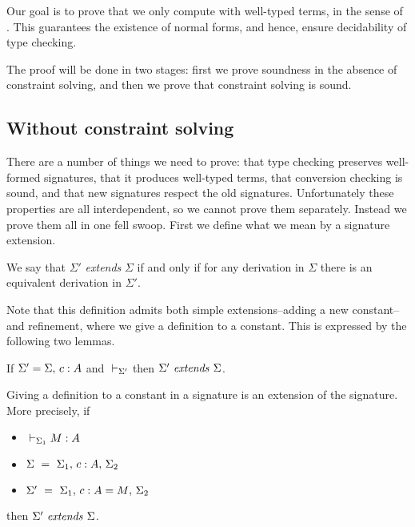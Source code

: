 
Our goal is to prove that we only compute with well-typed terms, in the sense
of {\Core}. This guarantees the existence of normal forms, and hence, ensure
decidability of type checking.

The proof will be done in two stages: first we prove soundness in the absence
of constraint solving, and then we prove that constraint solving
is sound.

\subsection{Without constraint solving}

There are a number of things we need to prove: that type checking preserves
well-formed signatures, that it produces well-typed terms, that conversion
checking is sound, and that new signatures respect the old signatures.
Unfortunately these properties are all interdependent, so we cannot prove them
separately. Instead we prove them all in one fell swoop. First we define what
we mean by a signature extension.

\begin{definition} \label{defSigExt}
    We say that $\Sigma'$ {\em extends} $\Sigma$ if and only if for any {\Core}
    derivation in $\Sigma$ there is an equivalent derivation in $\Sigma'$.
\end{definition}

Note that this definition admits both simple extensions--adding a new
constant--and refinement, where we give a definition to a constant. This is
expressed by the following two lemmas.

\begin{lemma} \label{lemWeakenSig}
    If $\Sigma' = {\Sigma},\,{} {c:A}$ and ${} \vdash_{\Sigma'}$ then ${\Sigma'} ~ \mathit{extends} ~ {\Sigma}$.
\end{lemma}

\begin{lemma} \label{lemRefineSig}
    Giving a definition to a constant in a signature is an extension of the
    signature.
\if {}
    More precisely, if
    \begin{itemize}
	\item ${} \vdash_{\Sigma_1} {M} : {A}$
	\item $\Sigma ~ = ~ {\Sigma_1},\,{} {{c} : {A}},\,{} \Sigma_2$
	\item $\Sigma' ~ = ~ {\Sigma_1},\,{} {{c} : {A} = {M}},\,{} \Sigma_2$
    \end{itemize}
    then ${\Sigma'} ~ \mathit{extends} ~ {\Sigma}$.
\fi
\end{lemma}

